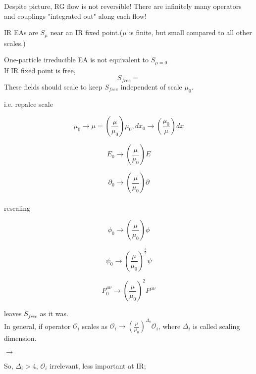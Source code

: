 \documentclass[type = bachelor]{fduthesis-en}
\begin{document}

Despite picture, RG flow is not reversible! There are infinitely many operators and couplings "integrated out" along each flow!

IR EAs are $S_{\mu}$ near an IR fixed point.($\mu$ is finite, but small compared to all other scales.)

One-particle irreducible EA is not equivalent to $S_{\mu=0}$
\bigskip\\
If IR fixed point is free,
\begin{equation}
\label{Sfree}
S_{free} = 
\end{equation}
These fields should scale to keep $S_{free}$ independent of scale $\mu_{0}$.

i.e. repalce scale

$$\mu_{0} \rightarrow \mu = (\frac{\mu}{\mu_{0}})\mu_{0}, dx_0 \rightarrow (\frac{\mu_0}{\mu})dx$$

$$E_0 \rightarrow (\frac{\mu}{\mu_0})E$$

$$\partial_0 \rightarrow (\frac{\mu}{\mu_0})\partial$$
\bigskip\\
rescaling

$$\phi_0 \rightarrow (\frac{\mu}{\mu_0})\phi$$

$$\psi_0 \rightarrow (\frac{\mu}{\mu_0})^{\frac{3}{2}}\psi$$

$$F^{\mu\nu}_0 \rightarrow (\frac{\mu}{\mu_0})^2F^{\mu\nu}$$

leaves $S_{free}$ as it was.
\bigskip\\
In general, if operator $\mathcal{O}_i$ scales as $\mathcal{O}_i \rightarrow (\frac{\mu}{\mu_0})^{\Delta_i}\mathcal{O}_i$, where $\Delta_i$ is called scaling dimension.

$\rightarrow$

\noindent So, $\Delta_i > 4$, $\mathcal{O}_i$ irrelevant, less important at IR;
\end{document}
